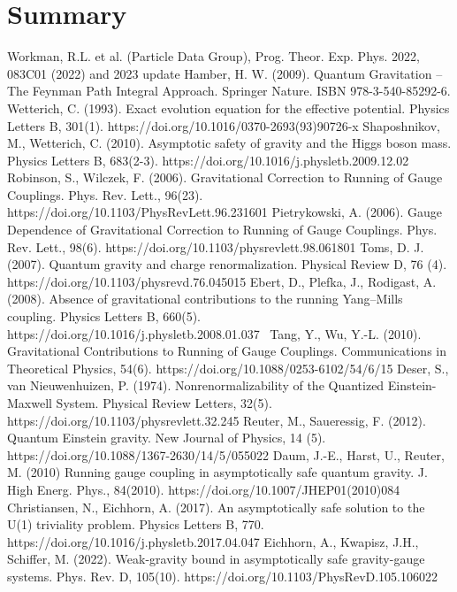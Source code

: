 \documentclass[11pt, a4paper]{article}
\begin{document}
\section*{Summary}

\begin{thebibliography}{9}
    Workman, R.L. et al. (Particle Data Group), Prog. Theor. Exp. Phys. 2022, 083C01 (2022) and 2023 update
    Hamber, H. W. (2009). Quantum Gravitation – The Feynman Path Integral Approach. Springer Nature. ISBN 978-3-540-85292-6.
    Wetterich, C. (1993). Exact evolution equation for the effective potential. Physics Letters B, 301(1). https://doi.org/10.1016/0370-2693(93)90726-x 
    Shaposhnikov, M., Wetterich, C. (2010). Asymptotic safety of gravity and the Higgs boson mass. Physics Letters B, 683(2-3). https://doi.org/10.1016/j.physletb.2009.12.02    
    Robinson, S., Wilczek, F. (2006). Gravitational Correction to Running of Gauge Couplings. Phys. Rev. Lett., 96(23). https://doi.org/10.1103/PhysRevLett.96.231601
    Pietrykowski, A. (2006). Gauge Dependence of Gravitational Correction to Running of Gauge Couplings. Phys. Rev. Lett., 98(6). https://doi.org/10.1103/physrevlett.98.061801
    Toms, D. J. (2007). Quantum gravity and charge renormalization. Physical Review D, 76 (4). https://doi.org/10.1103/physrevd.76.045015
    Ebert, D., Plefka, J., Rodigast, A. (2008). Absence of gravitational contributions to the running Yang–Mills coupling. Physics Letters B, 660(5). https://doi.org/10.1016/j.physletb.2008.01.037 
    Tang, Y., Wu, Y.-L. (2010). Gravitational Contributions to Running of Gauge Couplings. Communications in Theoretical Physics, 54(6). https://doi.org/10.1088/0253-6102/54/6/15
    Deser, S., van Nieuwenhuizen, P. (1974). Nonrenormalizability of the Quantized Einstein-Maxwell System. Physical Review Letters, 32(5). https://doi.org/10.1103/physrevlett.32.245
    Reuter, M., Saueressig, F. (2012). Quantum Einstein gravity. New Journal of Physics, 14 (5). https://doi.org/10.1088/1367-2630/14/5/055022
    Daum, J.-E., Harst, U., Reuter, M. (2010) Running gauge coupling in asymptotically safe quantum gravity. J. High Energ. Phys., 84(2010). https://doi.org/10.1007/JHEP01(2010)084
    Christiansen, N., Eichhorn, A. (2017). An asymptotically safe solution to the U(1) triviality problem. Physics Letters B, 770. https://doi.org/10.1016/j.physletb.2017.04.047
    Eichhorn, A., Kwapisz, J.H., Schiffer, M. (2022). Weak-gravity bound in asymptotically safe gravity-gauge systems. Phys. Rev. D, 105(10). https://doi.org/10.1103/PhysRevD.105.106022
\end{thebibliography}
\end{document}
